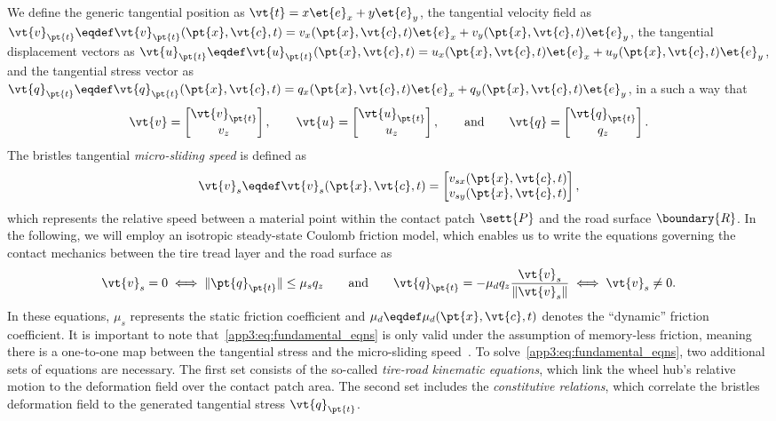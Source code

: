 We define the generic tangential position as $\vt{t} = x\et{e}_x + y\et{e}_y$, the tangential velocity field as $\vt{v}_{\pt{t}} \eqdef \vt{v}_{\pt{t}}(\pt{x}, \vt{c}, t) = v_x(\pt{x}, \vt{c}, t)\et{e}_x + v_y(\pt{x},\vt{c},t)\et{e}_y$, the tangential displacement vectors as $\vt{u}_{\pt{t}} \eqdef \vt{u}_{\pt{t}}(\pt{x},\vt{c},t) = u_x(\pt{x},\vt{c},t)\et{e}_x + u_y(\pt{x},\vt{c},t)\et{e}_y$, and the tangential stress vector as $\vt{q}_{\pt{t}} \eqdef \vt{q}_{\pt{t}}(\pt{x},\vt{c},t) = q_x(\pt{x},\vt{c},t)\et{e}_x + q_y(\pt{x},\vt{c},t)\et{e}_y$, in a such a way that
%
\begin{equation}
  \vt{v} =
  \begin{bmatrix}
    \vt{v}_{\pt{t}} \\
    v_z
  \end{bmatrix}, \qquad
  \vt{u} =
  \begin{bmatrix}
    \vt{u}_{\pt{t}} \\
    u_z
  \end{bmatrix}, \qquad \text{and} \qquad
  \vt{q} =
  \begin{bmatrix}
    \vt{q}_{\pt{t}} \\
    q_z
  \end{bmatrix}.
  \label{app3:eq:ut}
\end{equation}
%
The bristles tangential \emph{micro-sliding speed} is defined as
%
\begin{equation}
  \vt{v}_s \eqdef \vt{v}_s(\pt{x},\vt{c},t) =
  \begin{bmatrix}
    v_{sx}(\pt{x},\vt{c},t) \\
    v_{sy}(\pt{x},\vt{c},t)
  \end{bmatrix},
\end{equation}
%
which represents the relative speed between a material point within the contact patch $\sett{P}$ and the road surface $\boundary{R}$. In the following, we will employ an isotropic steady-state Coulomb friction model, which enables us to write the equations governing the contact mechanics between the tire tread layer and the road surface as
%
\begin{equation}
  \vt{v}_s = 0 \iff \|\pt{q}_{\pt{t}}\| \leq \mu_s q_z
  \qquad \text{and} \qquad
  \vt{q}_{\pt{t}} = -\mu_d q_z \dfrac{\vt{v}_s}{\|\vt{v}_s\|}
  \iff \vt{v}_s \neq 0.
  \label{app3:eq:fundamental_eqns}
\end{equation}
%
In these equations, $\mu_s$ represents the static friction coefficient and $\mu_d \eqdef \mu_d(\pt{x}, \vt{c}, t)$ denotes the ``dynamic'' friction coefficient. It is important to note that~\eqref{app3:eq:fundamental_eqns} is only valid under the assumption of memory-less friction, meaning there is a one-to-one map between the tangential stress and the micro-sliding speed~\cite{canudasdewit2003dynamic}. To solve~\eqref{app3:eq:fundamental_eqns}, two additional sets of equations are necessary. The first set consists of the so-called \emph{tire-road kinematic equations}, which link the wheel hub's relative motion to the deformation field over the contact patch area. The second set includes the \emph{constitutive relations}, which correlate the bristles deformation field to the generated tangential stress $\vt{q}_{\pt{t}}$.


